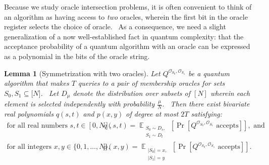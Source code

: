 \documentclass[10pt,a4paper]{article}
\newtheorem{lemma}[theorem]{Lemma}
\newcommand{\<}{\langle}
\renewcommand{\>}{\rangle}
\DeclareMathOperator{\E}{\mathbb E}
\begin{document}
Because we study oracle intersection problems, it is often convenient to
think of an algorithm as having access to \textit{two} oracles, wherein the
first bit in the oracle register selects the choice of oracle. \ As a
consequence, we need a slight generalization of a now well-established fact
in quantum complexity: that the acceptance probability of a quantum
algorithm with an oracle can be expressed as a polynomial in the bits of the
oracle string.

\begin{lemma}[Symmetrization with two oracles]
\label{lem:symmetrization} Let $Q^{\mathcal{O}_{S_{0}},\mathcal{O}_{S_{1}}}$
be a quantum algorithm that makes $T$ queries to a pair of membership
oracles for sets $S_{0},S_{1}\subseteq \lbrack N]$. \ Let $D_{\mu }$ denote
the distribution over subsets of $[N]$ wherein each element is selected
independently with probability $\frac{\mu }{N}$. \ Then there exist
bivariate real polynomials $q(s,t)$ and $p(x,y)$ of degree at most $2T$
satisfying:
\begin{align*}
\textrm{for all real numbers } s, t \in [0, N],& \quad
q(s,t)=\E_{\substack{ S_{0}\sim D_{s}, \\ S_{1}\sim D_{t}}}\left[ \Pr [Q^{
\mathcal{O}_{S_{0}},\mathcal{O}_{S_{1}}}\text{ accepts}]\right], \textrm{ and} \\
\textrm{for all integers } x, y \in \{0, 1, \dots, N\},& \quad
p(x,y)=\E_{\substack{ |S_{0}|=x, \\ |S_{1}|=y}}\left[ \Pr [Q^{\mathcal{O}
_{S_{0}},\mathcal{O}_{S_{1}}}\text{ accepts}]\right].
\end{align*}
\end{lemma}
\end{document}
